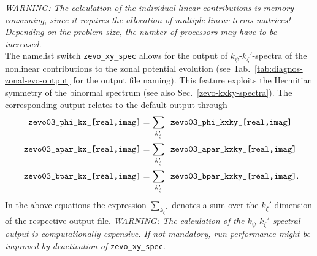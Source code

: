 \textit{WARNING: The calculation of the individual linear contributions is memory consuming, since it requires the allocation of multiple linear terms matrices! Depending on the problem size, the number of processors may have to be increased.} \\
The namelist switch \texttt{zevo\_xy\_spec} allows for the output of $k_\psi$-$k_\zeta'$-spectra of the nonlinear contributions to the zonal potential evolution (see Tab.~\ref{tab:diagnos-zonal-evo-output} for the output file naming).
This feature exploits the Hermitian symmetry of the binormal spectrum (see also Sec.~\ref{zevo-kxky-spectra}).
The corresponding output relates to the default output through
\begin{align}
\File{zevo03\_phi\_kx\_[real,imag]} & = \sum_{k_\zeta'} \File{zevo03\_phi\_kxky\_[real,imag]} \\
\File{zevo03\_apar\_kx\_[real,imag]} & = \sum_{k_\zeta'} \File{zevo03\_apar\_kxky\_[real,imag]} \\
\File{zevo03\_bpar\_kx\_[real,imag]} & = \sum_{k_\zeta'} \File{zevo03\_bpar\_kxky\_[real,imag]}.
\end{align}
In the above equations the expression $\sum_{k_\zeta'}$ denotes a sum over the $k_\zeta'$ dimension of the respective output file.
\textit{WARNING: The calculation of the $k_\psi$-$k_\zeta'$-spectral output is computationally expensive. 
If not mandatory, run performance might be improved by deactivation of} \texttt{zevo_xy_spec}.

